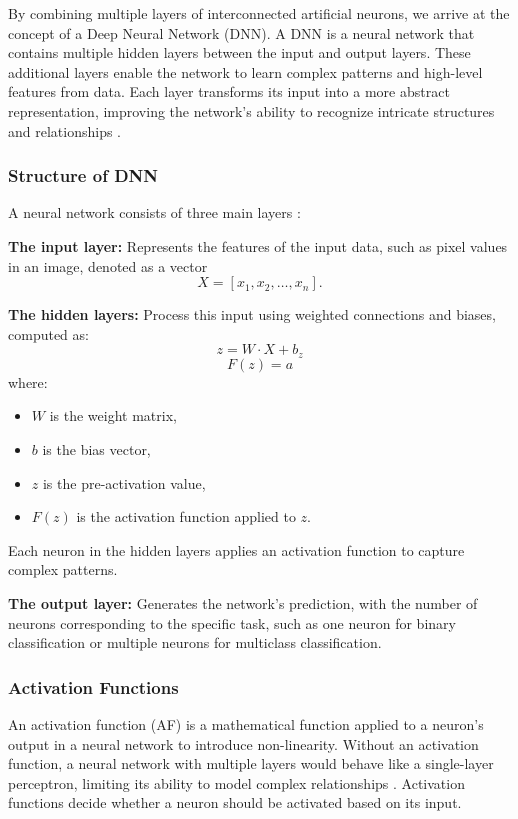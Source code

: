 By combining multiple layers of interconnected artificial neurons, we arrive at the concept of a Deep Neural Network (DNN). A DNN is a neural network that contains multiple hidden layers between the input and output layers. These additional layers enable the network to learn complex patterns and high-level features from data. Each layer transforms its input into a more abstract representation, improving the network’s ability to recognize intricate structures and relationships \parencite{li2021water}.
\subsubsection{Structure of DNN}
A neural network consists of three main layers \parencite{ren2023review}:

\noindent
\textbf{The input layer:} Represents the features of the input data, such as pixel values in an image, denoted as a vector 
\[
X = [x_1, x_2, \dots, x_n].
\]

\noindent
\textbf{The hidden layers:} Process this input using weighted connections and biases, computed as:
\[
z = W \cdot X + b_z \tag{1}
\]
\[
F(z) = a \tag{2}
\]
where:
\begin{itemize}
    \item $W$ is the weight matrix,
    \item $b$ is the bias vector,
    \item $z$ is the pre-activation value,
    \item $F(z)$ is the activation function applied to $z$.
\end{itemize}

Each neuron in the hidden layers applies an activation function to capture complex patterns.

\noindent
\textbf{The output layer:} Generates the network's prediction, with the number of neurons corresponding to the specific task, such as one neuron for binary classification or multiple neurons for multiclass classification.




\subsubsection{Activation Functions}
An activation function (AF) is a mathematical function applied to a neuron's output in a neural network to introduce non-linearity. Without an activation function, a neural network with multiple layers would behave like a single-layer perceptron, limiting its ability to model complex relationships \parencite{dubey2022activation}. Activation functions decide whether a neuron should be activated based on its input. 

